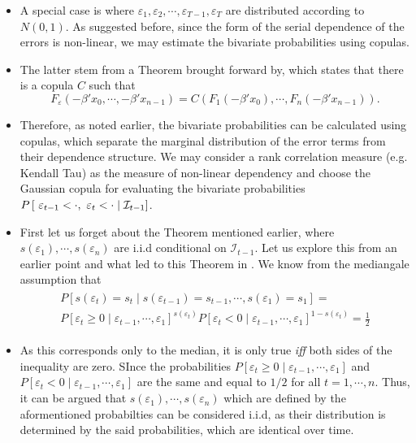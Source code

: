 \documentclass{beamer}
\begin{document}
\begin{frame}
\begin{itemize}
\item{}A special case is where $\varepsilon_1,\varepsilon_2,\cdots,\varepsilon_{T-1},\varepsilon_T$ are distributed according to $N(0,1)$. As suggested before, since the form of the serial dependence of the errors is non-linear, we may estimate the bivariate probabilities using copulas. 

\item{}The latter stem from a Theorem brought forward by, which states that there is a copula $C$ such that
\[
F_{\varepsilon}(-\beta' x_0,\cdots,-\beta' x_{n-1})=C(F_1(-\beta' x_0),\cdots,F_n(-\beta' x_{n-1})).
\]
\item{}Therefore, as noted earlier, the bivariate probabilities can be calculated using copulas, which separate the marginal distribution of the error terms from their dependence structure. We may consider a rank correlation measure (e.g. Kendall Tau) as the measure of non-linear dependency and choose the Gaussian copula for evaluating the bivariate probabilities $P\left[ \text{ }\varepsilon_{t-1}<\cdot ,\-
\text{ }\varepsilon_{t}<\cdot \mid \mathcal{I}_{t-1}\right]$.
\end{itemize}
\end{frame}

\begin{frame}
\begin{itemize}
\item{} First let us forget about the Theorem mentioned earlier, where $s(\varepsilon_1),\cdots, s(\varepsilon_n)$ are i.i.d conditional on $\mathcal{I}_{t-1}$. Let us explore this from an earlier point and what led to this Theorem in . We know from the mediangale assumption that
\begin{align*}
\begin{array}{l}
P[s(\varepsilon_t)=s_t\mid s(\varepsilon_{t-1})=s_{t-1},\cdots,s(\varepsilon_{1})=s_{1}]=\\
P[\varepsilon_t\geq0\mid \varepsilon_{t-1},\cdots,\varepsilon_{1}]^{s(\varepsilon_t)}
P[\varepsilon_t<0\mid \varepsilon_{t-1},\cdots,\varepsilon_{1}]^{1-s(\varepsilon_t)}=\frac{1}{2}
\end{array}
\end{align*}
\item{} As this corresponds only to the median, it is only true \textit{iff} both sides of the inequality are zero. SInce the probabilities $P[\varepsilon_t\geq0\mid \varepsilon_{t-1},\cdots,\varepsilon_{1}]$ and $P[\varepsilon_t<0\mid \varepsilon_{t-1},\cdots,\varepsilon_{1}]$ are the same and equal to $1/2$ for all $t=1,\cdots,n$. Thus, it can be argued that $s(\varepsilon_1),\cdots,s(\varepsilon_n)$ which are defined by the aformentioned probabilties can be considered i.i.d, as their distribution is determined by the said probabilities, which are identical over time.
\end{itemize}
\end{frame}
\end{document}
